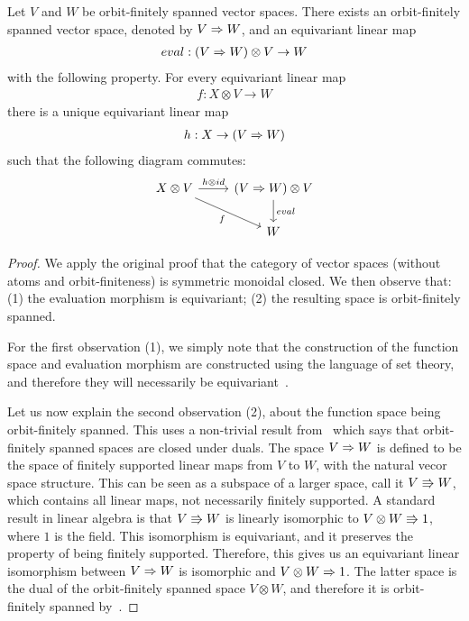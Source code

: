 \begin{theorem}\label{thm:orbit-finite-vector-space-closed}
    Let $V$ and $W$ be orbit-finitely spanned vector spaces. There exists an orbit-finitely spanned  vector space, denoted by  $V \Rightarrow W$, and an equivariant linear map
    \begin{align*}
    eval : (V \Rightarrow W) \otimes V \to W
    \end{align*}
    with the following property. For every equivariant linear map
    \begin{align*}
    f : X \otimes V \to W
    \end{align*}
    there is a unique equivariant linear map
    \begin{align*}
    h : X \to (V \Rightarrow W)
    \end{align*}
    such that the following diagram commutes:
    \[
    \begin{tikzcd}
    X \otimes V 
    \arrow[r,"h \otimes id"]
    \arrow[dr,"f"']
    &
    (\funspace V W) \otimes V
    \arrow[d,"eval"] \\
    &
    W
    \end{tikzcd}
    \]
\end{theorem}
\begin{proof} We apply the original proof that the category of vector spaces (without atoms and orbit-finiteness) is symmetric monoidal closed. We then observe that: (1) the evaluation morphism is equivariant; (2) the resulting space is orbit-finitely spanned. 
    
    For the first observation (1), we simply note that the construction of the function space and evaluation morphism are constructed using the language of set theory, and therefore they will necessarily be equivariant~\cite[Equivariance Principle]{bojanczyk_slightly2018}.

    Let us now explain the second observation (2), about the function space being orbit-finitely spanned. This uses a non-trivial result from~\cite{bojanczykKM21OrbitFiniteVector} which says that orbit-finitely spanned spaces are closed under duals. 
    The space $V \Rightarrow W$ is defined to be the space of finitely supported linear maps from $V$ to $W$, with the natural vecor space structure. This can be seen as a subspace of a larger space, call it $V \Rrightarrow W$, which contains all linear maps, not necessarily finitely supported. A standard result in linear algebra is that $V \Rrightarrow W$ is linearly isomorphic to $ V \otimes W \Rrightarrow 1$, where $1$ is the field. This isomorphism is equivariant, and it preserves the property of being finitely supported. Therefore, this gives us an equivariant linear isomorphism between $V \Rightarrow W$ is isomorphic and $ V \otimes W \Rightarrow 1$. The latter space is the dual of the orbit-finitely spanned space $V \otimes W$, and therefore it is orbit-finitely spanned by~\cite[Corollary VI.5]{bojanczykKM21OrbitFiniteVector}.
\end{proof}

